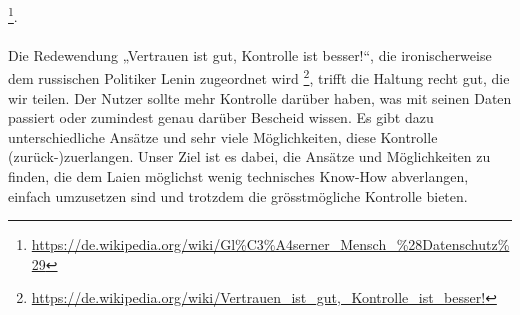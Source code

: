 \footnote{\url{https://de.wikipedia.org/wiki/Gl\%C3\%A4serner_Mensch_\%28Datenschutz\%29}}.
\\
\\
Die Redewendung „Vertrauen ist gut, Kontrolle ist besser!“, die ironischerweise dem russischen Politiker Lenin zugeordnet wird
\footnote{\url{https://de.wikipedia.org/wiki/Vertrauen_ist_gut,_Kontrolle_ist_besser!}}, 
trifft die Haltung recht gut, die wir teilen. Der Nutzer sollte mehr Kontrolle darüber haben, was mit seinen Daten passiert oder zumindest genau darüber Bescheid wissen. Es gibt dazu unterschiedliche Ansätze und sehr viele Möglichkeiten, diese Kontrolle (zurück-)zuerlangen. Unser Ziel ist es dabei, die Ansätze und Möglichkeiten zu finden, die dem Laien möglichst wenig technisches Know-How abverlangen, einfach umzusetzen sind und trotzdem die grösstmögliche Kontrolle bieten.

